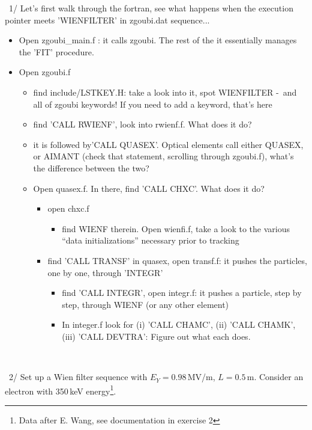 \documentclass[10pt]{article}
\newcommand{\nin}{\noindent~}
\begin{document}
\nin 1/ Let's  first walk through the fortran, see what happens when the execution pointer meets 'WIENFILTER'  in zgoubi.dat sequence...

\begin{itemize}
\item Open zgoubi\_main.f : it calls zgoubi. The rest of the it essentially manages the 'FIT' procedure.
\item Open zgoubi.f 
\begin{itemize}
  \item find include/LSTKEY.H: take a look into it, spot WIENFILTER -~and all of zgoubi keywords! If you need to add a keyword, that's here
  \item find 'CALL RWIENF', look into rwienf.f. What does it do?
  \item it is followed by'CALL QUASEX'. 
    Optical elements call either QUASEX, or AIMANT (check that statement, scrolling through zgoubi.f), what's the difference between the two? 
  \item  Open quasex.f.   In there, find 'CALL CHXC'. What does it do? 
  \begin{itemize}
    \item open chxc.f
    \begin{itemize}
      \item find WIENF therein. Open wienfi.f, take a look to the various ``data initializations'' necessary prior to tracking
      \end{itemize}
    \item find 'CALL TRANSF' in quasex, open transf.f: it pushes the particles, one by one, through 'INTEGR'
    \begin{itemize}
      \item find 'CALL INTEGR', open integr.f: it pushes a particle, step by step, 
        through WIENF (or any other element)
      \item In integer.f look for 
        (i) 'CALL CHAMC',
          (ii) 'CALL CHAMK', 
          (iii) 'CALL DEVTRA': 
          Figure out what each does.
    \end{itemize}
  \end{itemize}
\end{itemize}
\end{itemize}

~

\nin 2/ Set up a Wien filter sequence with $ E_Y=0.98$\,MV/m,  $ L=0.5$\,m.
Consider an electron with 350\,keV energy\footnote{Data after E. Wang, see documentation in exercise 2}. 
\end{document}
